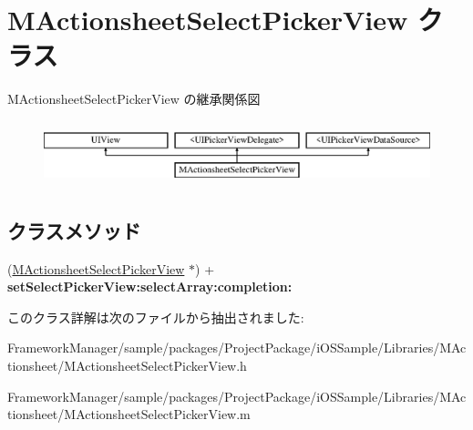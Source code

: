 \hypertarget{interface_m_actionsheet_select_picker_view}{}\section{M\+Actionsheet\+Select\+Picker\+View クラス}
\label{interface_m_actionsheet_select_picker_view}
M\+Actionsheet\+Select\+Picker\+View の継承関係図\begin{figure}[H]
\begin{center}
\leavevmode
\includegraphics[height=1.904762cm]{interface_m_actionsheet_select_picker_view}
\end{center}
\end{figure}
\subsection*{クラスメソッド}
\begin{DoxyCompactItemize}
\item 
\hypertarget{interface_m_actionsheet_select_picker_view_a6e75276878118e6e28642dd29fb108c3}{}(\hyperlink{interface_m_actionsheet_select_picker_view}{M\+Actionsheet\+Select\+Picker\+View} $\ast$) + {\bfseries set\+Select\+Picker\+View\+:select\+Array\+:completion\+:}\label{interface_m_actionsheet_select_picker_view_a6e75276878118e6e28642dd29fb108c3}

\end{DoxyCompactItemize}


このクラス詳解は次のファイルから抽出されました\+:\begin{DoxyCompactItemize}
\item 
Framework\+Manager/sample/packages/\+Project\+Package/i\+O\+S\+Sample/\+Libraries/\+M\+Actionsheet/M\+Actionsheet\+Select\+Picker\+View.\+h\item 
Framework\+Manager/sample/packages/\+Project\+Package/i\+O\+S\+Sample/\+Libraries/\+M\+Actionsheet/M\+Actionsheet\+Select\+Picker\+View.\+m\end{DoxyCompactItemize}

